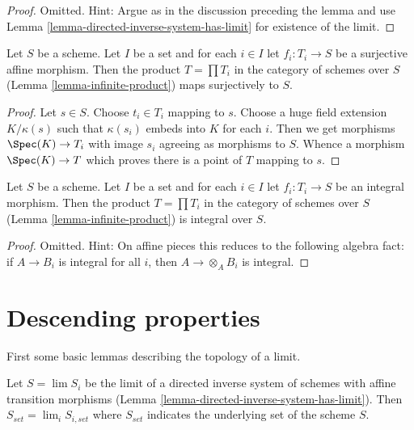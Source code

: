 \begin{proof}
Omitted. Hint: Argue as in the discussion preceding the lemma
and use Lemma \ref{lemma-directed-inverse-system-has-limit}
for existence of the limit.
\end{proof}

\begin{lemma}
\label{lemma-infinite-product-surjective}
Let $S$ be a scheme. Let $I$ be a set and for each $i \in I$
let $f_i : T_i \to S$ be a surjective affine morphism. Then the
product $T = \prod T_i$ in the category of schemes over $S$
(Lemma \ref{lemma-infinite-product})
maps surjectively to $S$.
\end{lemma}

\begin{proof}
Let $s \in S$. Choose $t_i \in T_i$ mapping to $s$.
Choose a huge field extension $K/\kappa(s)$ such that
$\kappa(s_i)$ embeds into $K$ for each $i$. Then we get
morphisms $\Spec(K) \to T_i$ with image $s_i$ agreeing
as morphisms to $S$. Whence a morphism $\Spec(K) \to T$
which proves there is a point of $T$ mapping to $s$.
\end{proof}

\begin{lemma}
\label{lemma-infinite-product-integral}
Let $S$ be a scheme. Let $I$ be a set and for each $i \in I$
let $f_i : T_i \to S$ be an integral morphism. Then the
product $T = \prod T_i$ in the category of schemes over $S$
(Lemma \ref{lemma-infinite-product})
is integral over $S$.
\end{lemma}

\begin{proof}
Omitted. Hint: On affine pieces this reduces to the following
algebra fact: if $A \to B_i$ is integral for all $i$, then
$A \to \otimes_A B_i$ is integral.
\end{proof}





\section{Descending properties}
\label{section-descent}

\noindent
First some basic lemmas describing the topology of a limit.

\begin{lemma}
\label{lemma-inverse-limit-sets}
Let $S = \lim S_i$ be the limit of a directed inverse system
of schemes with affine transition morphisms
(Lemma \ref{lemma-directed-inverse-system-has-limit}). Then
$S_{set} = \lim_i S_{i, set}$ where $S_{set}$
indicates the underlying set of the scheme $S$.
\end{lemma}

